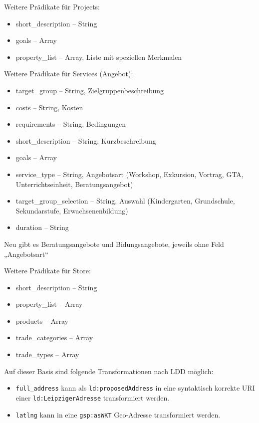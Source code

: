 \documentclass[a4paper,11pt]{article}
\begin{document}
Weitere Prädikate für Projects:
\begin{itemize}\itemsep0pt
  \item short\_description -- String
  \item goals -- Array
  \item property\_list -- Array, Liste mit speziellen Merkmalen
\end{itemize}

Weitere Prädikate für Services (Angebot):
\begin{itemize}\itemsep0pt
  \item target\_group -- String, Zielgruppenbeschreibung
  \item costs -- String, Kosten
  \item requirements -- String, Bedingungen
  \item short\_description -- String, Kurzbeschreibung
  \item goals -- Array
  \item service\_type -- String, Angebotsart (Workshop, Exkursion, Vortrag,
    GTA, Unterrichtseinheit, Beratungsangebot)
  \item target\_group\_selection -- String, Auswahl (Kindergarten,
    Grundschule, Sekundarstufe, Erwachsenenbildung)
  \item duration -- String
\end{itemize}
Neu gibt es Beratungsangebote und Bidungsangebote, jeweils ohne Feld
„Angebotsart“ 

Weitere Prädikate für Store:
\begin{itemize}\itemsep0pt
  \item short\_description -- String
  \item property\_list -- Array
  \item products -- Array
  \item trade\_categories -- Array
  \item trade\_types -- Array
\end{itemize}

Auf dieser Basis sind folgende Transformationen nach LDD möglich:
\begin{itemize}\raggedright
\item \texttt{full\_address} kann als \texttt{ld:proposedAddress} in eine
  syntaktisch korrekte URI einer \texttt{ld:LeipzigerAdresse} transformiert
  werden. 
\item \texttt{latlng} kann in eine \texttt{gsp:asWKT} Geo-Adresse
  transformiert werden.
\end{itemize}
\end{document}
